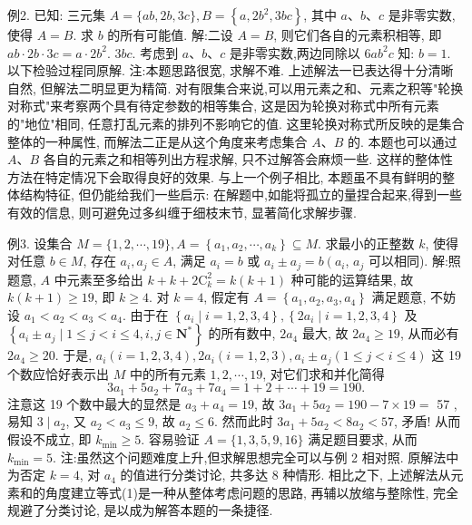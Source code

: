 例2. 已知: 三元集 $A=\{a b, 2 b, 3 c\}, B=\left\{a, 2 b^2, 3 b c\right\}$, 其中 $a 、 b 、 c$ 是非零实数,使得 $A=B$. 求 $b$ 的所有可能值.
解:二设 $A=B$, 则它们各自的元素积相等, 即 $a b \cdot 2 b \cdot 3 c=a \cdot 2 b^2$. $3 b c$. 考虑到 $a 、 b 、 c$ 是非零实数,两边同除以 $6 a b^2 c$ 知: $b=1$.
以下检验过程同原解.
注:本题思路很宽, 求解不难.
上述解法一已表达得十分清晰自然, 但解法二明显更为精简.
对有限集合来说,可以用元素之和、元素之积等"轮换对称式"来考察两个具有待定参数的相等集合, 这是因为轮换对称式中所有元素的"地位"相同, 任意打乱元素的排列不影响它的值.
这里轮换对称式所反映的是集合整体的一种属性, 而解法二正是从这个角度来考虑集合 $A 、 B$ 的.
本题也可以通过 $A 、 B$ 各自的元素之和相等列出方程求解, 只不过解答会麻烦一些.
这样的整体性方法在特定情况下会取得良好的效果.
与上一个例子相比, 本题虽不具有鲜明的整体结构特征, 但仍能给我们一些启示: 在解题中,如能将孤立的量捏合起来,得到一些有效的信息, 则可避免过多纠缠于细枝末节, 显著简化求解步骤.



例3. 设集合 $M=\{1,2, \cdots, 19\}, A=\left\{a_1, a_2, \cdots, a_k\right\} \subseteq M$. 求最小的正整数 $k$, 使得对任意 $b \in M$, 存在 $a_i, a_j \in A$, 满足 $a_i=b$ 或 $a_i \pm a_j=b\left(a_i\right.$, $a_j$ 可以相同). 
解:照题意, $A$ 中元素至多给出 $k+k+2 \mathrm{C}_k^2=k(k+1)$ 种可能的运算结果, 故 $k(k+1) \geqslant 19$, 即 $k \geqslant 4$.
对 $k=4$, 假定有 $A=\left\{a_1, a_2, a_3, a_4\right\}$ 满足题意, 不妨设 $a_1<a_2<a_3< a_4$. 由于在 $\left\{a_i \mid i=1,2,3,4\right\},\left\{2 a_i \mid i=1,2,3,4\right\}$ 及 $\left\{a_i \pm a_j \mid 1 \leqslant j<\right. \left.i \leqslant 4, i, j \in \mathbf{N}^*\right\}$ 的所有数中, $2 a_4$ 最大, 故 $2 a_4 \geqslant 19$, 从而必有 $2 a_4 \geqslant 20$.
于是, $a_i(i=1,2,3,4), 2 a_i(i=1,2,3), a_i \pm a_j(1 \leqslant j<i \leqslant 4)$ 这 19 个数应恰好表示出 $M$ 中的所有元素 $1,2, \cdots, 19$, 对它们求和并化简得
$$
3 a_1+5 a_2+7 a_3+7 a_4=1+2+\cdots+19=190 .
$$
注意这 19 个数中最大的显然是 $a_3+a_4=19$, 故 $3 a_1+5 a_2=190-7 \times 19=$ 57 , 易知 $3 \mid a_2$, 又 $a_2<a_3 \leqslant 9$, 故 $a_2 \leqslant 6$. 然而此时 $3 a_1+5 a_2<8 a_2<57$, 矛盾!
从而假设不成立, 即 $k_{\min } \geqslant 5$.
容易验证 $A=\{1,3,5,9,16\}$ 满足题目要求, 从而 $k_{\min }=5$.
注:虽然这个问题难度上升,但求解思想完全可以与例 2 相对照.
原解法中为否定 $k=4$, 对 $a_4$ 的值进行分类讨论, 共多达 8 种情形.
相比之下, 上述解法从元素和的角度建立等式(1)是一种从整体考虑问题的思路, 再辅以放缩与整除性, 完全规避了分类讨论, 是以成为解答本题的一条捷径.



